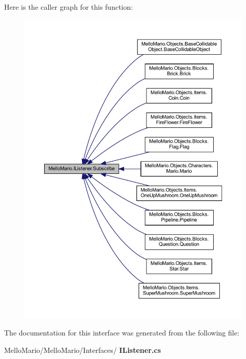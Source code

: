 Here is the caller graph for this function\+:
\nopagebreak
\begin{figure}[H]
\begin{center}
\leavevmode
\includegraphics[width=350pt]{interfaceMelloMario_1_1IListener_a7cc6b69de82ebae5ec8a4d6b4008a2bc_icgraph}
\end{center}
\end{figure}


The documentation for this interface was generated from the following file\+:\begin{DoxyCompactItemize}
\item 
Mello\+Mario/\+Mello\+Mario/\+Interfaces/\textbf{ I\+Listener.\+cs}\end{DoxyCompactItemize}
